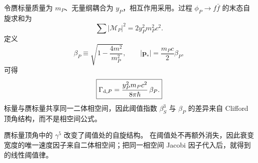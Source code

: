 \begin{exbox}
令赝标量质量为 $m_P$、无量纲耦合为 $y_P$，相互作用采用。过程 $\phi_P\to f\bar f$ 的末态自旋求和为
\begin{equation}
 \boxed{
 \sum|\mathcal M_P|^2=2y_P^2m_P^2c^2.}
 \label{eq:yukawa-pseudo-decay-M2-si-r10}
\end{equation}
定义
\begin{equation}
 \beta_P\equiv\sqrt{1-\frac{4m^2}{m_P^2}},
 \qquad
 |\mathbf p_*|=\frac{m_Pc}{2}\beta_P,
 \label{eq:yukawa-pseudo-beta-si-r15}
\end{equation}
可得
\begin{equation}
 \boxed{
 \Gamma_{{\rm d},P}
 =\frac{y_P^2m_P c^2}{8\pi\hbar}\,\beta_P.}
 \label{eq:yukawa-pseudo-decay-width-si-r10}
\end{equation}
标量与赝标量共享同一二体相空间，因此阈值指数 $\beta_S^3$ 与 $\beta_P$ 的差异来自 Clifford 顶角结构，而不是相空间公式。


\medskip

赝标量顶角中的 $\gamma^5$ 改变了阈值处的自旋结构。 在阈值处不再额外消失，因此衰变宽度的唯一速度因子来自二体相空间；把同一相空间 Jacobi 因子代入后，就得到 的线性阈值律。


\end{exbox}

